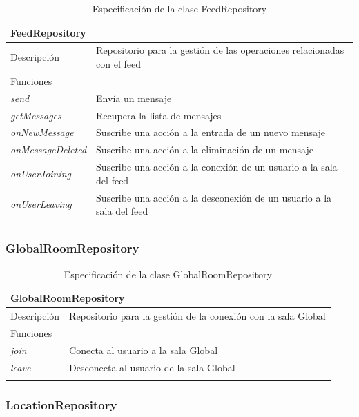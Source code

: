 \begin{longtable}{|p{} p{}|}
    \hline
    \multicolumn{2}{|l|}{FeedRepository} \\ \hline \hline
    Descripción      & Repositorio para la gestión de las operaciones relacionadas con el feed \\ \hline
    \multicolumn{2}{|l|}{Funciones} \\
    \emph{send}  & Envía un mensaje \\
    \emph{getMessages}  & Recupera la lista de mensajes \\
    \emph{onNewMessage}  & Suscribe una acción a la entrada de un nuevo mensaje \\
    \emph{onMessageDeleted}  & Suscribe una acción a la eliminación de un mensaje \\
    \emph{onUserJoining}  & Suscribe una acción a la conexión de un usuario a la sala del feed \\
    \emph{onUserLeaving}  & Suscribe una acción a la desconexión de un usuario a la sala del feed \\ \hline
    \caption{Especificación de la clase FeedRepository}
    \label{class:app:feed_repository}
\end{longtable}

\subsubsection{GlobalRoomRepository}

\begin{longtable}{|p{} p{}|}
    \hline
    \multicolumn{2}{|l|}{GlobalRoomRepository} \\ \hline \hline
    Descripción      & Repositorio para la gestión de la conexión con la sala Global \\ \hline
    \multicolumn{2}{|l|}{Funciones} \\
    \emph{join}  & Conecta al usuario a la sala Global \\
    \emph{leave}  & Desconecta al usuario de la sala Global \\ \hline
    \caption{Especificación de la clase GlobalRoomRepository}
    \label{class:app:global_room_repository}
\end{longtable}

\subsubsection{LocationRepository}

